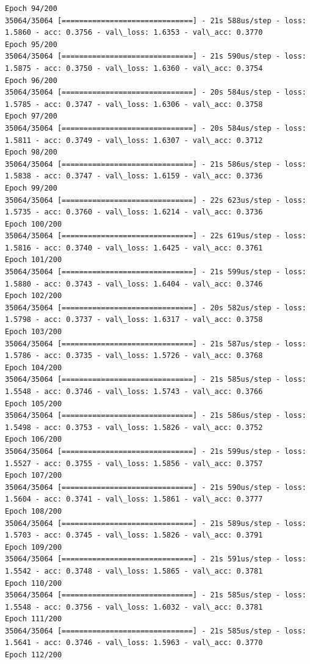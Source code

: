 \documentclass[11pt]{article}
\begin{document}
\begin{Verbatim}[commandchars=\\\{\}]
Epoch 94/200
35064/35064 [==============================] - 21s 588us/step - loss: 1.5860 - acc: 0.3756 - val\_loss: 1.6353 - val\_acc: 0.3770
Epoch 95/200
35064/35064 [==============================] - 21s 590us/step - loss: 1.5875 - acc: 0.3750 - val\_loss: 1.6360 - val\_acc: 0.3754
Epoch 96/200
35064/35064 [==============================] - 20s 584us/step - loss: 1.5785 - acc: 0.3747 - val\_loss: 1.6306 - val\_acc: 0.3758
Epoch 97/200
35064/35064 [==============================] - 20s 584us/step - loss: 1.5811 - acc: 0.3749 - val\_loss: 1.6307 - val\_acc: 0.3712
Epoch 98/200
35064/35064 [==============================] - 21s 586us/step - loss: 1.5838 - acc: 0.3747 - val\_loss: 1.6159 - val\_acc: 0.3736
Epoch 99/200
35064/35064 [==============================] - 22s 623us/step - loss: 1.5735 - acc: 0.3760 - val\_loss: 1.6214 - val\_acc: 0.3736
Epoch 100/200
35064/35064 [==============================] - 22s 619us/step - loss: 1.5816 - acc: 0.3740 - val\_loss: 1.6425 - val\_acc: 0.3761
Epoch 101/200
35064/35064 [==============================] - 21s 599us/step - loss: 1.5880 - acc: 0.3743 - val\_loss: 1.6404 - val\_acc: 0.3746
Epoch 102/200
35064/35064 [==============================] - 20s 582us/step - loss: 1.5798 - acc: 0.3737 - val\_loss: 1.6317 - val\_acc: 0.3758
Epoch 103/200
35064/35064 [==============================] - 21s 587us/step - loss: 1.5786 - acc: 0.3735 - val\_loss: 1.5726 - val\_acc: 0.3768
Epoch 104/200
35064/35064 [==============================] - 21s 585us/step - loss: 1.5548 - acc: 0.3746 - val\_loss: 1.5743 - val\_acc: 0.3766
Epoch 105/200
35064/35064 [==============================] - 21s 586us/step - loss: 1.5498 - acc: 0.3753 - val\_loss: 1.5826 - val\_acc: 0.3752
Epoch 106/200
35064/35064 [==============================] - 21s 599us/step - loss: 1.5527 - acc: 0.3755 - val\_loss: 1.5856 - val\_acc: 0.3757
Epoch 107/200
35064/35064 [==============================] - 21s 590us/step - loss: 1.5604 - acc: 0.3741 - val\_loss: 1.5861 - val\_acc: 0.3777
Epoch 108/200
35064/35064 [==============================] - 21s 589us/step - loss: 1.5703 - acc: 0.3745 - val\_loss: 1.5826 - val\_acc: 0.3791
Epoch 109/200
35064/35064 [==============================] - 21s 591us/step - loss: 1.5542 - acc: 0.3748 - val\_loss: 1.5865 - val\_acc: 0.3781
Epoch 110/200
35064/35064 [==============================] - 21s 585us/step - loss: 1.5548 - acc: 0.3756 - val\_loss: 1.6032 - val\_acc: 0.3781
Epoch 111/200
35064/35064 [==============================] - 21s 585us/step - loss: 1.5641 - acc: 0.3746 - val\_loss: 1.5963 - val\_acc: 0.3770
Epoch 112/200

\end{Verbatim}
\end{document}
